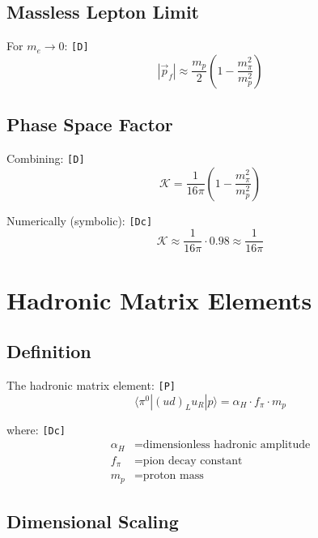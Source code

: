 \documentclass[11pt,a4paper]{article}
\newcommand{\tagD}{\textcolor{green!50!black}{\texttt{[D]}}}
\newcommand{\tagDc}{\textcolor{blue!70!black}{\texttt{[Dc]}}}
\newcommand{\tagP}{\textcolor{orange!80!black}{\texttt{[P]}}}
\theoremstyle{definition}
\begin{document}
\subsection{Massless Lepton Limit}
\label{app:massless}

For $m_e \to 0$: \tagD{}
\begin{equation}
\label{eq:massless-limit}
|\vec{p}_f| \approx \frac{m_p}{2} \left(1 - \frac{m_\pi^2}{m_p^2}\right)
\end{equation}

\subsection{Phase Space Factor}
\label{app:ps-factor}

Combining: \tagD{}
\begin{equation}
\label{eq:ps-factor-full}
\mathcal{K} = \frac{1}{16\pi} \left(1 - \frac{m_\pi^2}{m_p^2}\right)
\end{equation}

Numerically (symbolic): \tagDc{}
\begin{equation}
\label{eq:ps-approx}
\mathcal{K} \approx \frac{1}{16\pi} \cdot 0.98 \approx \frac{1}{16\pi}
\end{equation}

\section{Hadronic Matrix Elements}
\label{app:hadronic}

\subsection{Definition}
\label{app:hadronic-def}

The hadronic matrix element: \tagP{}
\begin{equation}
\label{eq:hadronic-me}
\langle \pi^0 | (ud)_L u_R | p \rangle = \alpha_H \cdot f_\pi \cdot m_p
\end{equation}

where: \tagDc{}
\begin{align}
\label{eq:alpha-h-def}
\alpha_H &= \text{dimensionless hadronic amplitude} \\
\label{eq:f-pi-def}
f_\pi &= \text{pion decay constant} \\
\label{eq:m-p-def}
m_p &= \text{proton mass}
\end{align}

\subsection{Dimensional Scaling}
\label{app:dimensional}
\end{document}
